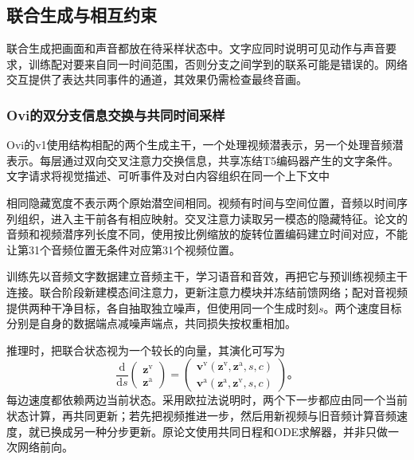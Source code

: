 \subsection{联合生成与相互约束}
\label{sec:vision-multigen-joint-mechanism}

联合生成把画面和声音都放在待采样状态中。文字应同时说明可见动作与声音要求，训练配对要来自同一时间范围，否则分支之间学到的联系可能是错误的。网络交互提供了表达共同事件的通道，其效果仍需检查最终音画。

\subsubsection{Ovi的双分支信息交换与共同时间采样}
\label{sec:vision-multigen-ovi}

Ovi的v1使用结构相配的两个生成主干，一个处理视频潜表示，另一个处理音频潜表示。每层通过双向交叉注意力交换信息，共享冻结T5编码器产生的文字条件。文字请求将视觉描述、可听事件及对白内容组织在同一个上下文中

相同隐藏宽度不表示两个原始潜空间相同。视频有时间与空间位置，音频以时间序列组织，进入主干前各有相应映射。交叉注意力读取另一模态的隐藏特征。论文的音频和视频潜序列长度不同，使用按比例缩放的旋转位置编码建立时间对应，不能让第31个音频位置无条件对应第31个视频位置。

训练先以音频文字数据建立音频主干，学习语音和音效，再把它与预训练视频主干连接。联合阶段新建模态间注意力，更新注意力模块并冻结前馈网络；配对音视频提供两种干净目标，各自抽取独立噪声，但使用同一个生成时刻$s$。两个速度目标分别是自身的数据端点减噪声端点，共同损失按权重相加。

推理时，把联合状态视为一个较长的向量，其演化可写为
\begin{equation}
 \frac{\mathrm d}{\mathrm ds}
 \begin{pmatrix}\bm z^{\mathrm v}\\ \bm z^{\mathrm a}\end{pmatrix}
 =
 \begin{pmatrix}
 \bm v^{\mathrm v}(\bm z^{\mathrm v},\bm z^{\mathrm a},s,c)\\
 \bm v^{\mathrm a}(\bm z^{\mathrm a},\bm z^{\mathrm v},s,c)
 \end{pmatrix}\text{。}
 \label{eq:vision-joint-flow}
\end{equation}
每边速度都依赖两边当前状态。采用欧拉法说明时，两个下一步都应由同一个当前状态计算，再共同更新；若先把视频推进一步，然后用新视频与旧音频计算音频速度，就已换成另一种分步更新。原论文使用共同日程和ODE求解器，并非只做一次网络前向。


